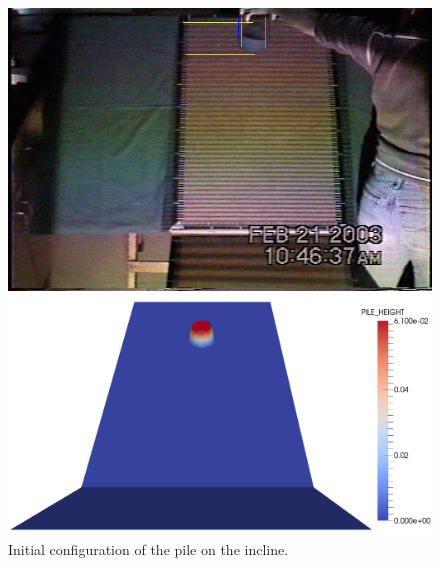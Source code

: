 \documentclass[review]{elsarticle}
\begin{document}
\begin{figure}[!ht]
        \begin{minipage}[b]{.5\linewidth}        
                \centering
                \includegraphics[width=1\textwidth]{IMAGES/expinitialconf.png}
        \end{minipage}
        \begin{minipage}[b]{.5\linewidth}
                \centering
                \includegraphics[width=1\textwidth]{IMAGES/initialconf.png}
        \end{minipage}
        \caption{Initial configuration of the pile on the incline.}
        \label{initialconf}
\end{figure}
\end{document}
